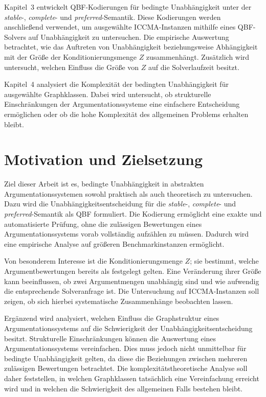 Kapitel~3 entwickelt QBF-Kodierungen für bedingte Unabhängigkeit unter der \emph{stable}-, \emph{complete}- und \emph{preferred}-Semantik. 
Diese Kodierungen werden anschließend verwendet, um ausgewählte ICCMA-Instanzen mithilfe eines QBF-Solvers auf Unabhängigkeit zu untersuchen. 
Die empirische Auswertung betrachtet, wie das Auftreten von Unabhängigkeit beziehungsweise Abhängigkeit mit der Größe der Konditionierungsmenge \(Z\) zusammenhängt. 
Zusätzlich wird untersucht, welchen Einfluss die Größe von \(Z\) auf die Solverlaufzeit besitzt.

Kapitel~4 analysiert die Komplexität der bedingten Unabhängigkeit für ausgewählte Graphklassen. Dabei wird untersucht, 
ob strukturelle Einschränkungen der Argumentationssysteme eine einfachere Entscheidung ermöglichen oder ob die hohe Komplexität des allgemeinen Problems erhalten bleibt.

\section{Motivation und Zielsetzung}
\label{sec:einleitung-motivation}

Ziel dieser Arbeit ist es, bedingte Unabhängigkeit in abstrakten Argumentationssystemen sowohl praktisch als auch theoretisch zu untersuchen. 
Dazu wird die Unabhängigkeitsentscheidung für die \emph{stable}-, \emph{complete}- und \emph{preferred}-Semantik als QBF formuliert.
Die Kodierung ermöglicht eine exakte und automatisierte Prüfung, ohne die zulässigen Bewertungen eines Argumentationssystems vorab vollständig aufzählen zu müssen. 
Dadurch wird eine empirische Analyse auf größeren Benchmarkinstanzen ermöglicht.

Von besonderem Interesse ist die Konditionierungsmenge \(Z\); sie bestimmt, welche Argumentbewertungen bereits als festgelegt gelten. 
Eine Veränderung ihrer Größe kann beeinflussen, ob zwei Argumentmengen unabhängig sind und wie aufwendig die entsprechende Solveranfrage ist. 
Die Untersuchung auf ICCMA-Instanzen soll zeigen, ob sich hierbei systematische Zusammenhänge beobachten lassen.

Ergänzend wird analysiert, welchen Einfluss die Graphstruktur eines Argumentationssystems auf die Schwierigkeit der Unabhängigkeitsentscheidung besitzt. 
Strukturelle Einschränkungen können die Auswertung eines Argumentationssystems vereinfachen. Dies muss jedoch nicht unmittelbar für bedingte Unabhängigkeit gelten, 
da diese die Beziehungen zwischen mehreren zulässigen Bewertungen betrachtet. Die komplexitätstheoretische Analyse soll daher feststellen,
in welchen Graphklassen tatsächlich eine Vereinfachung erreicht wird und in welchen die Schwierigkeit des allgemeinen Falls bestehen bleibt.